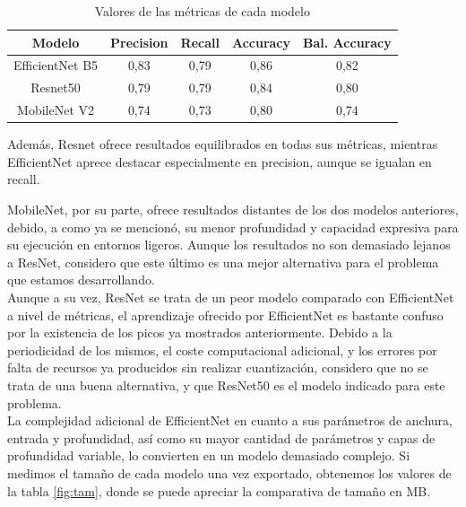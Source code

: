 \begin{table}[H]
	\centering
	\begin{tabular}{|c|c|c|c|c|}
		\hline
		\textbf{Modelo} & \textbf{Precision} & \textbf{Recall} & \textbf{Accuracy} & \textbf{Bal. Accuracy} \\ \hline
		EfficientNet B5 & 0,83 & 0,79 & 0,86 & 0,82 \\ \hline
		Resnet50 & 0,79 & 0,79 & 0,84 & 0,80 \\ \hline
		MobileNet V2 & 0,74 & 0,73 & 0,80 & 0,74 \\ \hline
	\end{tabular}
	\caption{Valores de las métricas de cada modelo}
	\label {fig:metricas}
\end{table}

Además, Resnet ofrece resultados equilibrados en todas sus métricas, mientras EfficientNet aprece destacar especialmente en precision, aunque se igualan en recall.

MobileNet, por su parte, ofrece resultados distantes de los dos modelos anteriores, debido, a como ya se mencionó, su menor profundidad y capacidad expresiva para su ejecución en entornos ligeros. Aunque los resultados no son demasiado lejanos a ResNet, considero que este último es una mejor alternativa para el problema que estamos desarrollando.\\

Aunque a su vez, ResNet se trata de un peor modelo comparado con EfficientNet a nivel de métricas, el aprendizaje ofrecido por EfficientNet es bastante confuso por la existencia de los picos ya mostrados anteriormente. Debido a la periodicidad de los mismos, el coste computacional adicional, y los errores por falta de recursos ya producidos sin realizar cuantización, considero que no se trata de una buena alternativa, y que ResNet50 es el modelo indicado para este problema.\\

La complejidad adicional de EfficientNet en cuanto a sus parámetros de anchura, entrada y profundidad, así como su mayor cantidad de parámetros y capas de profundidad variable, lo convierten en un modelo demasiado complejo. Si medimos el tamaño de cada modelo una vez exportado, obtenemos los valores de la tabla \ref{fig:tam}, donde se puede apreciar la comparativa de tamaño en MB.

